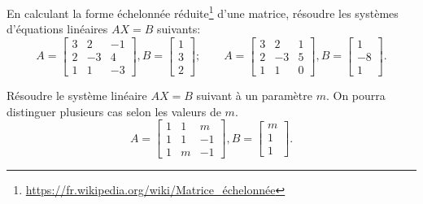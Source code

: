 \begin{exercice}
    En calculant la forme échelonnée
    réduite\footnote{\url{https://fr.wikipedia.org/wiki/Matrice_échelonnée}}
    d'une matrice, résoudre les systèmes d'équations linéaires $AX=B$
    suivants:
\[
A = \left[\begin{matrix}3 & 2 & -1\\2 & -3 & 4\\1 & 1 & -3\end{matrix}\right],
B = \left[\begin{matrix}1\\3\\2\end{matrix}\right];
\qquad
A = \left[\begin{matrix}3 & 2 & 1\\2 & -3 & 5\\1 & 1 & 0\end{matrix}\right],
B = \left[\begin{matrix}1\\-8\\1\end{matrix}\right].
\]
\end{exercice}


\begin{exercice}
Résoudre le système linéaire $AX=B$ suivant à un paramètre $m$. On pourra
distinguer plusieurs cas selon les valeurs de $m$.
\[
A = \left[\begin{matrix}1 & 1 & m\\1 & 1 & -1\\1 & m & -1\end{matrix}\right],
B = \left[\begin{matrix}m\\1\\1\end{matrix}\right].
\]
\end{exercice}

